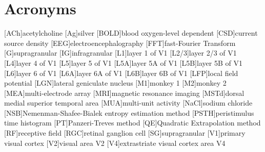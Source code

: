 \usepackage{siunitx}         %
\DeclareSIUnit{}      %
\usepackage{acronym}
\chapter*{Acronyms}
\begin{acronym}[BOLD]
    [ACh]{acetylcholine}
    [Ag]{silver}
    [BOLD]{blood oxygen-level dependent}
    [CSD]{current source density}
    [EEG]{electroencephalography}
    [FFT]{fast-Fourier Transform}
    [G]{supragranular}
    [IG]{infragranular}
    [L1]{layer 1 of \ac{V1}}
    [L2/3]{layer 2/3 of \ac{V1}}
    [L4]{layer 4 of \ac{V1}}
    [L5]{layer 5 of \ac{V1}}
    [L5A]{layer 5A of \ac{V1}}
    [L5B]{layer 5B of \ac{V1}}
    [L6]{layer 6 of \ac{V1}}
    [L6A]{layer 6A of \ac{V1}}
    [L6B]{layer 6B of \ac{V1}}
    [LFP]{local field potential}
    [LGN]{lateral geniculate nucleus}
    [M1]{monkey 1}
    [M2]{monkey 2}
    [MEA]{multi-electrode array}
    [MRI]{magnetic resonance imaging}
    [MSTd]{dorsal medial superior temporal area}
    [MUA]{multi-unit activity}
    [NaCl]{sodium chloride}
    [NSB]{{N}emenman-{S}hafee-{B}ialek entropy estimation method}
    [PSTH]{peristimulus time histogram}
    [PT]{{P}anzeri-{T}reves method}
    [QE]{Quadratic Extrapolation method}
    [RF]{receptive field}
    [RGC]{retinal ganglion cell}
    [SG]{supragranular}
    [V1]{primary visual cortex}
    [V2]{visual area {V2}}
    [V4]{extrastriate visual cortex area {V4}}
\end{acronym}
